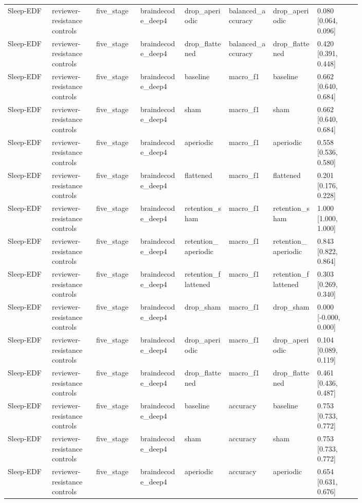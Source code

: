 \begin{longtable}{p{0.10\linewidth}p{0.10\linewidth}p{0.10\linewidth}p{0.10\linewidth}p{0.10\linewidth}p{0.10\linewidth}p{0.10\linewidth}p{0.10\linewidth}}
Sleep-EDF & reviewer-resistance controls & five\_stage & braindecode\_deep4 & drop\_aperiodic & balanced\_accuracy & drop\_aperiodic & 0.080 [0.064, 0.096]\\
Sleep-EDF & reviewer-resistance controls & five\_stage & braindecode\_deep4 & drop\_flattened & balanced\_accuracy & drop\_flattened & 0.420 [0.391, 0.448]\\
Sleep-EDF & reviewer-resistance controls & five\_stage & braindecode\_deep4 & baseline & macro\_f1 & baseline & 0.662 [0.640, 0.684]\\
Sleep-EDF & reviewer-resistance controls & five\_stage & braindecode\_deep4 & sham & macro\_f1 & sham & 0.662 [0.640, 0.684]\\
Sleep-EDF & reviewer-resistance controls & five\_stage & braindecode\_deep4 & aperiodic & macro\_f1 & aperiodic & 0.558 [0.536, 0.580]\\
Sleep-EDF & reviewer-resistance controls & five\_stage & braindecode\_deep4 & flattened & macro\_f1 & flattened & 0.201 [0.176, 0.228]\\
Sleep-EDF & reviewer-resistance controls & five\_stage & braindecode\_deep4 & retention\_sham & macro\_f1 & retention\_sham & 1.000 [1.000, 1.000]\\
Sleep-EDF & reviewer-resistance controls & five\_stage & braindecode\_deep4 & retention\_aperiodic & macro\_f1 & retention\_aperiodic & 0.843 [0.822, 0.864]\\
Sleep-EDF & reviewer-resistance controls & five\_stage & braindecode\_deep4 & retention\_flattened & macro\_f1 & retention\_flattened & 0.303 [0.269, 0.340]\\
Sleep-EDF & reviewer-resistance controls & five\_stage & braindecode\_deep4 & drop\_sham & macro\_f1 & drop\_sham & 0.000 [-0.000, 0.000]\\
Sleep-EDF & reviewer-resistance controls & five\_stage & braindecode\_deep4 & drop\_aperiodic & macro\_f1 & drop\_aperiodic & 0.104 [0.089, 0.119]\\
Sleep-EDF & reviewer-resistance controls & five\_stage & braindecode\_deep4 & drop\_flattened & macro\_f1 & drop\_flattened & 0.461 [0.436, 0.487]\\
Sleep-EDF & reviewer-resistance controls & five\_stage & braindecode\_deep4 & baseline & accuracy & baseline & 0.753 [0.733, 0.772]\\
Sleep-EDF & reviewer-resistance controls & five\_stage & braindecode\_deep4 & sham & accuracy & sham & 0.753 [0.733, 0.772]\\
Sleep-EDF & reviewer-resistance controls & five\_stage & braindecode\_deep4 & aperiodic & accuracy & aperiodic & 0.654 [0.631, 0.676]\\

\end{longtable}
